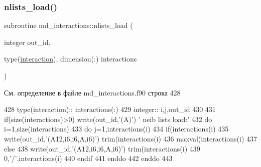 \subsubsection{\texorpdfstring{nlists\+\_\+load()}{nlists\_load()}}
{\footnotesize\ttfamily subroutine md\+\_\+interactions\+::nlists\+\_\+load (\begin{DoxyParamCaption}\item[{integer}]{out\+\_\+id,  }\item[{type(\mbox{\hyperlink{structmd__interactions_1_1interaction}{interaction}}), dimension(\+:)}]{interactions }\end{DoxyParamCaption})}



См. определение в файле md\+\_\+interactions.\+f90 строка 428


\begin{DoxyCode}
428     \textcolor{keywordtype}{type}(interaction):: interactions(:)
429     \textcolor{keywordtype}{integer}:: i,j,out\_id
430     
431     \textcolor{keywordflow}{if}(\textcolor{keyword}{size}(interactions)>0) \textcolor{keyword}{write}(out\_id,\textcolor{stringliteral}{'(A)'}) \textcolor{stringliteral}{' neib lists load:'}     
432     \textcolor{keywordflow}{do} i=1,\textcolor{keyword}{size}(interactions)
433         \textcolor{keywordflow}{do} j=1,interactions(i)%
434             \textcolor{keywordflow}{if}(interactions(i)%
435                 \textcolor{keyword}{write}(out\_id,\textcolor{stringliteral}{'(A12,i6,i6,A,i6)'}) trim(interactions(i)%
436                 maxval(interactions(i)%
437             \textcolor{keywordflow}{else}
438                 \textcolor{keyword}{write}(out\_id,\textcolor{stringliteral}{'(A12,i6,i6,A,i6)'}) trim(interactions(i)%
439                 0,\textcolor{stringliteral}{'/'},interactions(i)%
440 \textcolor{keywordflow}{            endif}
441 \textcolor{keywordflow}{        enddo}
442 \textcolor{keywordflow}{    enddo}
443     
\end{DoxyCode}
\mbox{\label{namespacemd__interactions_a4cbfd0c1d189320866efb63454722170}} 
